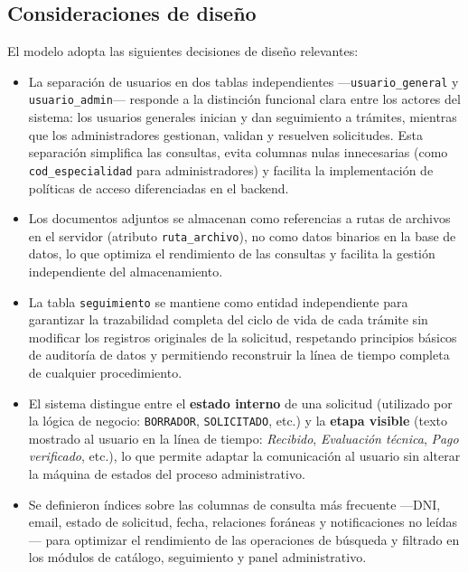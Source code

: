 \subsection{Consideraciones de diseño}

El modelo adopta las siguientes decisiones de diseño relevantes:

\begin{itemize}
  \item La separación de usuarios en dos tablas independientes
        ---\texttt{usuario\_general} y \texttt{usuario\_admin}--- responde a la
        distinción funcional clara entre los actores del sistema: los usuarios generales
        inician y dan seguimiento a trámites, mientras que los administradores gestionan,
        validan y resuelven solicitudes. Esta separación simplifica las consultas, evita
        columnas nulas innecesarias (como \texttt{cod\_especialidad} para
        administradores) y facilita la implementación de políticas de acceso
        diferenciadas en el backend.

  \item Los documentos adjuntos se almacenan como referencias a rutas de archivos en el
        servidor (atributo \texttt{ruta\_archivo}), no como datos binarios en la base de
        datos, lo que optimiza el rendimiento de las consultas y facilita la gestión
        independiente del almacenamiento.

  \item La tabla \texttt{seguimiento} se mantiene como entidad independiente para
        garantizar la trazabilidad completa del ciclo de vida de cada trámite sin
        modificar los registros originales de la solicitud, respetando principios básicos
        de auditoría de datos y permitiendo reconstruir la línea de tiempo completa de
        cualquier procedimiento.

  \item El sistema distingue entre el \textbf{estado interno} de una solicitud (utilizado
        por la lógica de negocio: \texttt{BORRADOR}, \texttt{SOLICITADO}, etc.) y la
        \textbf{etapa visible} (texto mostrado al usuario en la línea de tiempo:
        \emph{Recibido}, \emph{Evaluación técnica}, \emph{Pago verificado}, etc.), lo
        que permite adaptar la comunicación al usuario sin alterar la máquina de estados
        del proceso administrativo.

  \item Se definieron índices sobre las columnas de consulta más frecuente ---DNI, email,
        estado de solicitud, fecha, relaciones foráneas y notificaciones no leídas---
        para optimizar el rendimiento de las operaciones de búsqueda y filtrado en los
        módulos de catálogo, seguimiento y panel administrativo.
\end{itemize}

